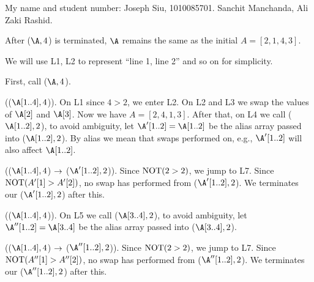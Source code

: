 \documentclass[11pt, sakura, night, 1in]{hw}
\begin{document}
My name and student number: Joseph Siu, 1010085701. Sanchit Manchanda, Ali Zaki Rashid.

\begin{comment}
Recall the algorithm \SRT\, that sorts an array \A$[1..n]$ into nondecreasing order when $n$ is a power of 2 and that calls an auxillary function \AUX.
\newfunc{\tbf{SRT}($\A[1..n],n$)}{
    \aif{$n>1$ \THEN}{
        \as \SRT($\A[1..\frac{n}{2}],\frac{n}{2}$)
        \as \SRT($\A[\frac{n}{2}+1..n],\frac{n}{2}$)
        \as \AUX($\A[1..n],n$)
    }
}

\newfunc{\tbf{AUX}($\A[1..n],n$)}{
    \aif{$n>2$ \THEN}{
        \afor{\ag{i}{1}\ato $\frac{n}{4}$ \DO}{
            \as swap the value of \A$[i+\frac{n}{4}]$ and \A$[i+\frac{n}{2}]$
        }
        \as \AUX($\A[1..\frac{n}{2}],\frac{n}{2}$)
        \as \AUX($\A[\frac{n}{2}+1..n],\frac{n}{2}$)
        \as \AUX($\A[\bra{\frac{n}{4}+1}..\frac{3n}{4}], \frac{n}{2}$)
        \aelif{$\A[1]>\A[2]$ \THEN}
        \as swap the value of $\A[1]$ and $\A[2]$
    }
}

\newq{1}{
    What happens when \AUX($\A, 4$) is called, where $\A=[2,1,4,3]$? Briefly explain your answer.
}
\end{comment}

 After \AUX($\A, 4$) is terminated, $\A$ remains the same as the initial $A=[2,1,4,3]$.

We will use L1, L2 to represent ``line 1, line 2'' and so on for simplicity.


First, call \AUX($\A, 4$).
    
(\AUX($\A[1..4], 4$)). On L1 since $4>2$, we enter L2. On L2 and L3 we swap the values of $\A[2]$ and $\A[3]$. Now we have $A=[2,4,1,3]$. After that, on L4 we call \AUX($\A[1..2],2$), to avoid ambiguity, let $\A'[1..2]=\A[1..2]$ be the alias array passed into \AUX($\A[1..2],2$). By alias we mean that swaps performed on, e.g., $\A'[1..2]$ will also affect $\A[1..2]$.

(\AUX($\A[1..4], 4$) $\rightarrow$ \AUX($\A'[1..2],2$)). Since $\mathrm{NOT}(2>2)$, we jump to L7. Since $\mathrm{NOT}(A'[1]>A'[2])$, no swap has performed from \AUX($\A'[1..2],2$). We terminates our \AUX($\A'[1..2],2$) after this.

(\AUX($\A[1..4], 4$)). On L5 we call \AUX($\A[3..4],2$), to avoid ambiguity, let $\A''[1..2]=\A[3..4]$ be the alias array passed into \AUX($\A[3..4],2$).

(\AUX($\A[1..4], 4$) $\rightarrow$ \AUX($\A''[1..2],2$)). Since $\mathrm{NOT}(2>2)$, we jump to L7. Since $\mathrm{NOT}(A''[1]>A''[2])$, no swap has performed from \AUX($\A''[1..2],2$). We terminates our \AUX($\A''[1..2],2$) after this.
\end{document}
